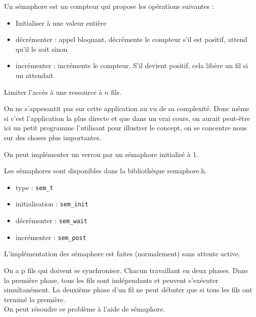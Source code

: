 \begin{definition}
	Un sémaphore est un compteur qui propose les opérations suivantes :
	\begin{itemize}
		\item Initialiser à une valeur entière
		\item décrémenter : appel bloquant, décrémente le compteur s'il est positif, attend qu'il le soit sinon
		\item incrémenter : incrémente le compteur. S'il devient positif, cela libère un fil si un attendait
	\end{itemize} 
\end{definition}

\begin{appl}
	Limiter l'accès à une ressource à $n$ fils.
\end{appl}

\begin{com}
	On ne s’appesantit pas sur cette application au vu de sa complexité. Donc même si c'est l'application la plus directe et que dans un vrai cours, on aurait peut-être ici un petit programme l'utilisant pour illustrer le concept, on se concentre nous sur des choses plus importantes.
\end{com}

\begin{rem}
	On peut implémenter un verrou par un sémaphore initialisé à 1.
\end{rem}

\begin{impl}
	Les sémaphores sont disponibles dans la bibliothèque semaphore.h.
	\begin{itemize}
		\item type : \texttt{sem\_t}
		\item initialisation : \texttt{sem\_init}
		\item décrémenter : \texttt{sem\_wait}
		\item incrémenter : \texttt{sem\_post}
	\end{itemize}
\end{impl}

\begin{proposition}
	L'implémentation des sémaphore est faites (normalement) sans attente active.
\end{proposition}

\begin{appl}
	On a p fils qui doivent se synchroniser. Chacun travaillant en deux phases. Dans la première phase, tous les fils sont indépendants et peuvent s’exécuter simultanément. La deuxième phase d'un fil ne peut débuter que si tous les fils ont terminé la première.\\
	
	On peut résoudre ce problème à l'aide de sémaphore.
\end{appl}

